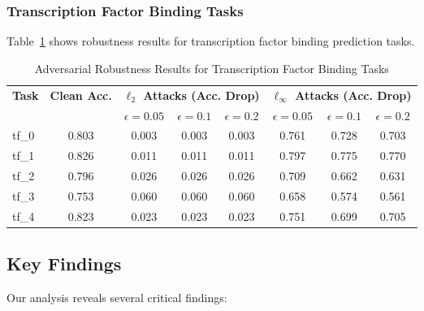 \documentclass{article} %
\begin{document}
\subsubsection{Transcription Factor Binding Tasks}

Table~\ref{tab:tf_results} shows robustness results for transcription factor binding prediction tasks.

\begin{table}[h]
\centering
\caption{Adversarial Robustness Results for Transcription Factor Binding Tasks}
\label{tab:tf_results}
\begin{tabular}{lccccccc}
\toprule
\multirow{2}{*}{\textbf{Task}} & \multirow{2}{*}{\textbf{Clean Acc.}} & \multicolumn{3}{c}{\textbf{$\ell_2$ Attacks (Acc. Drop)}} & \multicolumn{3}{c}{\textbf{$\ell_\infty$ Attacks (Acc. Drop)}} \\
\cmidrule(lr){3-5} \cmidrule(lr){6-8}
& & $\epsilon=0.05$ & $\epsilon=0.1$ & $\epsilon=0.2$ & $\epsilon=0.05$ & $\epsilon=0.1$ & $\epsilon=0.2$ \\
\midrule
tf\_0 & 0.803 & 0.003 & 0.003 & 0.003 & 0.761 & 0.728 & 0.703 \\
tf\_1 & 0.826 & 0.011 & 0.011 & 0.011 & 0.797 & 0.775 & 0.770 \\
tf\_2 & 0.796 & 0.026 & 0.026 & 0.026 & 0.709 & 0.662 & 0.631 \\
tf\_3 & 0.753 & 0.060 & 0.060 & 0.060 & 0.658 & 0.574 & 0.561 \\
tf\_4 & 0.823 & 0.023 & 0.023 & 0.023 & 0.751 & 0.699 & 0.705 \\
\bottomrule
\end{tabular}
\end{table}

\subsection{Key Findings}

Our analysis reveals several critical findings:
\end{document}
